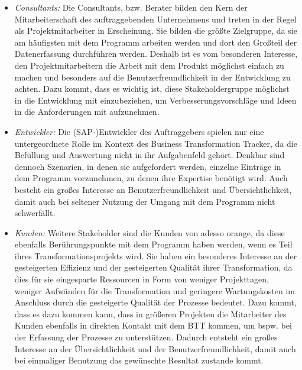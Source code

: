 \begin{itemize}
    \item[] \emph{Consultants:} Die Consultants, bzw. Berater bilden den Kern der Mitarbeiterschaft des auftraggebenden Unternehmens und treten in der Regel als Projektmitarbeiter in Erscheinung. Sie bilden die größte Zielgruppe, da sie am häufigsten mit dem Programm arbeiten werden und dort den Großteil der Datenerfassung durchführen werden. Deshalb ist es vom besonderen Interesse, den Projektmitarbeitern die Arbeit mit dem Produkt möglichst einfach zu machen und besonders auf die Benutzerfreundlichkeit in der Entwicklung zu achten. Dazu kommt, dass es wichtig ist, diese Stakeholdergruppe möglichst in die Entwicklung mit einzubeziehen, um Verbesserungsvorschläge und Ideen in die Anforderungen mit aufzunehmen. 
    \item[] \emph{Entwickler:} Die (SAP-)Entwickler des Auftraggebers spielen nur eine untergeordnete Rolle im Kontext des Business Transformation Tracker, da die Befüllung und Auswertung nicht in ihr Aufgabenfeld gehört. Denkbar sind dennoch Szenarien, in denen sie aufgefordert werden, einzelne Einträge in dem Programm vorzunehmen, zu denen ihre Expertise benötigt wird. Auch besteht ein großes Interesse an Benutzerfreundlichkeit und Übersichtlichkeit, damit auch bei seltener Nutzung der Umgang mit dem Programm nicht schwerfällt.
    \item[] \emph{Kunden:} Weitere Stakeholder sind die Kunden von adesso orange, da diese ebenfalls Berührungspunkte mit dem Programm haben werden, wenn es Teil ihres Transformationsprojekts wird. Sie haben ein besonderes Interesse an der gesteigerten Effizienz und der gesteigerten Qualität ihrer Transformation, da dies für sie eingesparte Ressourcen in Form von weniger Projekttagen, weniger Aufwänden für die Transformation und geringere Wartungskosten im Anschluss durch die gesteigerte Qualität der Prozesse bedeutet. Dazu kommt, dass es dazu kommen kann, dass in größeren Projekten die Mitarbeiter des Kunden ebenfalls in direkten Kontakt mit dem BTT kommen, um bspw. bei der Erfassung der Prozesse zu unterstützen. Dadurch entsteht ein großes Interesse an der Übersichtlichkeit und der Benutzerfreundlichkeit, damit auch bei einmaliger Benutzung das gewünschte Resultat zustande kommt.
\end{itemize}

